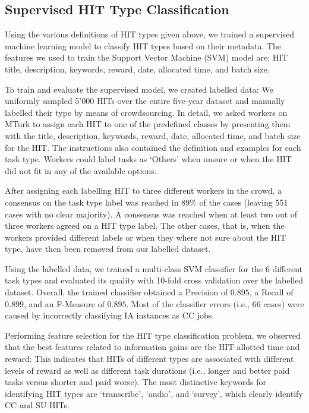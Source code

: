 \subsection{Supervised HIT Type Classification}
Using the various definitions of HIT types given above, we trained a supervised machine learning model to classify HIT types based on their metadata. The features we used to train the Support Vector Machine (SVM) model are: HIT title, description, keywords, reward, date, allocated time, and batch size.

To train and evaluate the supervised model, we created labelled data: We uniformly sampled 5'000 HITs over the entire five-year dataset and manually labelled their type by means of crowdsourcing. In detail, we asked workers on MTurk to assign each HIT to one of the predefined classes by presenting them with the title, description, keywords, reward, date, allocated time, and batch size for the HIT. The instructions also contained the definition and examples for each task type. Workers could label tasks as `Others' when unsure or when the HIT did not fit in any of the available options.

After assigning each labelling HIT to three different workers in the crowd, a consensus on the task type label was reached in $89\%$ of the cases (leaving 551 cases with no clear majority). A consensus was reached when at least two out of three workers agreed on a HIT type label. The other cases, that is, when the workers provided different labels or when they where not sure about the HIT type, have then been removed from our labelled dataset.

Using the labelled data, we trained a multi-class SVM classifier for the 6 different task types and evaluated its quality with 10-fold cross validation over the labelled dataset. Overall, the trained classifier obtained a Precision of $0.895$, a Recall of $0.899$, and an F-Measure of $0.895$. Most of the classifier errors (i.e., 66 cases) were caused by incorrectly classifying IA instances as CC jobs.

Performing feature selection for the HIT type classification problem, we observed that the best features related to information gains are the HIT allotted time and reward: This indicates that HITs of different types are associated with different levels of reward as well as different task durations (i.e., longer and better paid tasks versus shorter and paid worse). 
The most distinctive keywords for identifying HIT types are `transcribe', `audio', and `survey', which clearly identify CC and SU HITs.
 
